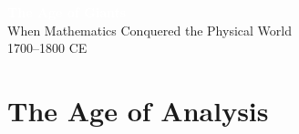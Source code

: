 
{
\begin{frame}[plain]
  \centering
  \vfill
  \textcolor{white}{\Huge\bfseries The Age of Giants}\\[0.7em]
  \textcolor{white!85}{\Large When Mathematics Conquered the Physical World}\\[1.5em]
  \textcolor{white!65}{\large 1700--1800 CE}
  \vfill
  \vfill
\end{frame}
}

\section{The Age of Analysis}

